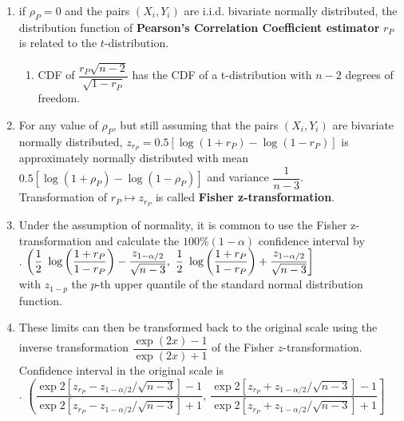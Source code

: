 \begin{enumerate}[series=binvar-normal]
    \item if $\rho_P = 0$ and the pairs $(X_i , Y_i )$ are i.i.d. bivariate normally distributed, the distribution function of \textbf{Pearson’s Correlation Coefficient estimator} $r_P$ is related to the $t$-distribution.
    \hfill \cite{statistics/book/Statistics-for-Data-Scientists/Maurits-Kaptein}
    \begin{enumerate}
        \item  CDF of $\dfrac{r_P \sqrt{n - 2}}{\sqrt{1 - r_P}}$ has the CDF of a t-distribution with $n - 2$ degrees of freedom.
        \hfill \cite{statistics/book/Statistics-for-Data-Scientists/Maurits-Kaptein}

    \end{enumerate}

    \item  For any value of $\rho_P$, but still assuming that the pairs $(X_i , Y_i )$ are bivariate normally distributed, $z_{r_P} = 0.5[\log(1 + r_P ) - \log(1 - r_P )]$ is approximately normally distributed with mean $0.5[\log(1 + \rho_P ) - \log(1 - \rho_P )]$ and variance $\dfrac{1}{n - 3}$.
    \hfill \cite{statistics/book/Statistics-for-Data-Scientists/Maurits-Kaptein}
    \\
    Transformation of $r_P \mapsto z_{r_P}$ is called \textbf{Fisher z-transformation}.
    \hfill \cite{statistics/book/Statistics-for-Data-Scientists/Maurits-Kaptein, common/online/chatgpt}

    \item Under the assumption of normality, it is common to use the Fisher z-transformation and calculate the $100\%(1 - \alpha)$ confidence interval by
    \hfill \cite{statistics/book/Statistics-for-Data-Scientists/Maurits-Kaptein}
    \\[0.3cm]
    .\hfill
    $
        \left(
            \dfrac{1}{2}\ \log\left(\dfrac{1 + r_P}{ 1 - r_P}\right) - \dfrac{z_{1-\alpha/2}}{\sqrt{n - 3}} ,
            \ \dfrac{1}{2}\ \log\left(\dfrac{1 + r_P}{ 1 - r_P}\right) + \dfrac{z_{1-\alpha/2}}{\sqrt{n - 3}}
        \right ]
    $
    \hfill \cite{statistics/book/Statistics-for-Data-Scientists/Maurits-Kaptein}
    \\[0.3cm]
    with $z_{1 - p}$ the $p$-th upper quantile of the standard normal distribution function.


    \item These limits can then be transformed back to the original scale using the inverse transformation $\dfrac{\exp({2x}) - 1}{\exp({2x}) + 1}$ of the Fisher $z$-transformation.
    Confidence interval in the original scale is
    \hfill \cite{statistics/book/Statistics-for-Data-Scientists/Maurits-Kaptein}
    \\[0.3cm]
    .\hfill
    $
        \left(
            \dfrac{\exp{2[z_{r_P} - z_{1-\alpha/2}/\sqrt{n-3}]} - 1}{\exp{2[z_{r_P} - z_{1-\alpha/2}/\sqrt{n-3}]} + 1},
            \ \dfrac{\exp{2[z_{r_P} + z_{1-\alpha/2}/\sqrt{n-3}]} - 1}{\exp{2[z_{r_P} + z_{1-\alpha/2}/\sqrt{n-3}]} + 1}
        \right]
    $
    \hfill \cite{statistics/book/Statistics-for-Data-Scientists/Maurits-Kaptein}


\end{enumerate}
